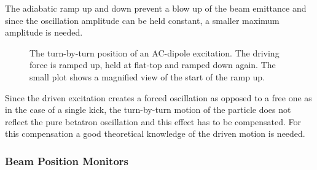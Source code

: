 The adiabatic ramp up and down prevent a blow up of the beam emittance and since the oscillation amplitude
can be held constant, a smaller maximum amplitude is needed. 
%
\begin{figure}[h]
    \centering
    \caption{
        The turn-by-turn position of an AC-dipole excitation. The driving force is ramped up,
        held at flat-top and ramped down again.
        The small plot shows a magnified view of the start of the ramp up.
    }
    \label{fig_ac_plot}
\end{figure}
%
Since the driven excitation creates a forced oscillation as opposed to a free one as in the case of
a single kick, the turn-by-turn motion of the particle does not reflect the pure betatron oscillation
and this effect has to be compensated. For this compensation a good theoretical knowledge of the driven
motion is needed.


\subsubsection{Beam Position Monitors}

